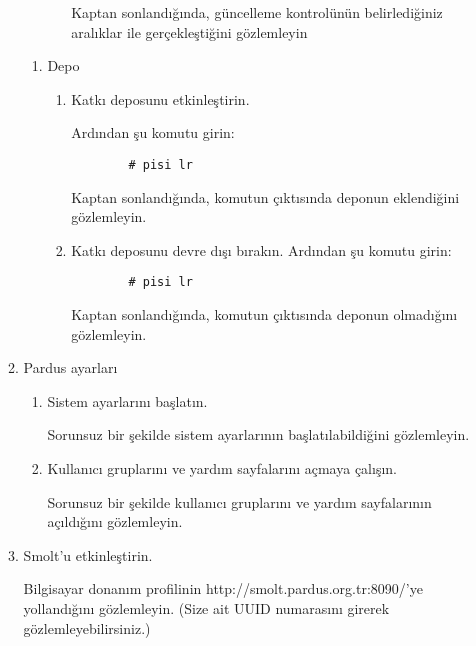 \documentclass[a4paper,10pt]{article}
\begin{document}
\begin{enumerate}
\begin{enumerate}
\begin{enumerate}
\begin{enumerate}
		Kaptan sonlandığında, güncelleme kontrolünün belirlediğiniz aralıklar ile gerçekleştiğini gözlemleyin
            \end{enumerate}
        \end{enumerate}

        \begin{enumerate}
        \item Depo
            \begin{enumerate}
            \item Katkı deposunu etkinleştirin.

                Ardından şu komutu girin:
		\begin{verbatim}
		# pisi lr 
		\end{verbatim}
                 Kaptan sonlandığında, komutun çıktısında deponun eklendiğini gözlemleyin.
            \item Katkı deposunu devre dışı bırakın.
                Ardından şu komutu girin:
		\begin{verbatim}
		# pisi lr 
		\end{verbatim}
                 Kaptan sonlandığında, komutun çıktısında deponun olmadığını gözlemleyin.
            \end{enumerate}
        \end{enumerate}

    \item Pardus ayarları
        \begin{enumerate}
        \item Sistem ayarlarını başlatın.

	Sorunsuz bir şekilde sistem ayarlarının başlatılabildiğini gözlemleyin.

        \item Kullanıcı gruplarını ve yardım sayfalarını açmaya çalışın.

	Sorunsuz bir şekilde kullanıcı gruplarını ve yardım sayfalarının açıldığını gözlemleyin.
        \end{enumerate}

    \item Smolt'u etkinleştirin. 
 
      Bilgisayar donanım profilinin http://smolt.pardus.org.tr:8090/'ye yollandığını gözlemleyin. (Size ait UUID numarasını girerek gözlemleyebilirsiniz.)
    \end{enumerate}
\end{enumerate}
\end{document}
